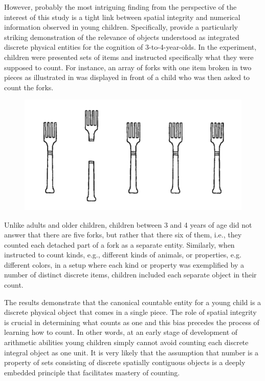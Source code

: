 However, probably the most intriguing finding from the perspective of the interest of this study is a tight link between spatial integrity and numerical information observed in young children. Specifically, \citet{shipley_shepperson1990countable} provide a particularly striking demonstration of the relevance of objects understood as integrated discrete physical entities for the cognition of 3-to-4-year-olds. In the experiment, children were presented sets of items and instructed specifically what they were supposed to count. For instance, an array of forks with one item broken in two pieces as illustrated in   was displayed in front of a child who was then asked to count the forks. 

\begin{figure}[h!]
\centering
\includegraphics[scale=0.4]{figures/forks.png}
\label{fig:relevance-of-integrity-in-counting}
\end{figure}

Unlike adults and older children, children between 3 and 4 years of age did not answer that there are five forks, but rather that there six of them, i.e., they counted each detached part of a fork as a separate entity. Similarly, when instructed to count kinds, e.g., different kinds of animals, or properties, e.g. different colors, in a setup where each kind or property was exemplified by a number of distinct discrete items, children included each separate object in their count.

The results demonstrate that the canonical countable entity for a young child is a discrete physical object that comes in a single piece. The role of spatial integrity is crucial in determining what counts as one and this bias precedes the process of learning how to count. In other words, at an early stage of development of arithmetic abilities young children simply cannot avoid counting each discrete integral object as one unit. It is very likely that the assumption that number is a property of sets consisting of discrete spatially contiguous objects is a deeply embedded principle that facilitates mastery of counting.\largerpage[2]

